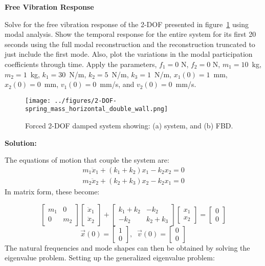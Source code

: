 \documentclass[12pt,letter]{article}
\begin{document}
	\begin{example}
	\textbf{Free Vibration Response}
	
	\noindent Solve for the free vibration response of the 2-DOF presented in figure~\ref{fig:2-DOF-spring_mass_horizontal_double_wall} using modal analysis. Show the temporal response for the entire system for its first 20 seconds using the full modal reconstruction and the reconstruction truncated to just include the first mode. Also, plot the variations in the modal participation coefficients through time. Apply the parameters, $f_1 = 0$ N, $f_2 = 0$ N, $m_1 = 10$~kg, $m_2 = 1$~kg, $k_1 = 30$~N/m, $k_2 = 5$~N/m, $k_3 = 1$~N/m, $x_1(0) = 1$~mm, $x_2(0) = 0$~mm, $v_1(0) = 0$~mm/s, and $v_2(0) = 0$~mm/s.
	
	\begin{figure}[H]
		\centering
		\texttt{[image: ../figures/2-DOF-spring\_mass\_horizontal\_double\_wall.png]}
		\caption{Forced 2-DOF damped system showing: (a) system, and (b) FBD.}
		\label{fig:2-DOF-spring_mass_horizontal_double_wall}
	\end{figure}

\noindent \textbf{Solution:} 

\noindent The equations of motion that couple the system are:
	\begin{eqnarray}
	m_1\ddot{x}_1 + (k_1+k_2)x_1 - k_2x_2 = 0 \\
	m_2\ddot{x}_2 + (k_2+k_3)x_2 - k_2x_1 = 0 \nonumber
	\end{eqnarray}
	In matrix form, these become:
	
	\begin{equation}
		  \begin{bmatrix} m_1 & 0 \\    0  & m_2 \end{bmatrix} \begin{bmatrix} \ddot{x}_1 \\    \ddot{x}_2  \end{bmatrix} + \begin{bmatrix} k_1 + k_2 & -k_2 \\  -k_2  & k_2 + k_3 \end{bmatrix} \begin{bmatrix} x_1 \\    x_2  \end{bmatrix} = \begin{bmatrix} 0 \\  0  \end{bmatrix} 
	\end{equation}
	\begin{equation}
		  \vec{x}(0) = \begin{bmatrix} 1 \\  0 \end{bmatrix},\; \; \vec{v}(0) = \begin{bmatrix} 0 \\  0 \end{bmatrix} \nonumber
	\end{equation}
	The natural frequencies and mode shapes can then be obtained by solving the eigenvalue problem. Setting up the generalized eigenvalue problem: %
	

\end{example}
\end{document}
